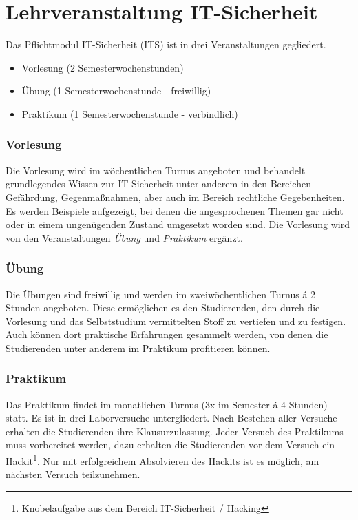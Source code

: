 \section{Lehrveranstaltung IT-Sicherheit} \label{sec:Lehrveranstaltung_IT-Sicherheit}

Das Pflichtmodul IT-Sicherheit (ITS) ist in drei Veranstaltungen gegliedert. \cite[S.30]{hochschuleniederrheinModulhandbuchVollzeitBA2019}
\begin{itemize}
	\item Vorlesung (2 Semesterwochenstunden)
	\item Übung (1 Semesterwochenstunde - freiwillig)
	\item Praktikum (1 Semesterwochenstunde - verbindlich)
\end{itemize}

\subsubsection{Vorlesung}
Die Vorlesung wird im wöchentlichen Turnus angeboten und behandelt grundlegendes Wissen zur IT-Sicherheit unter anderem in den Bereichen Gefährdung, Gegenmaßnahmen, aber auch im Bereich rechtliche Gegebenheiten. Es werden Beispiele aufgezeigt, bei denen die angesprochenen Themen gar nicht oder in einem ungenügenden Zustand umgesetzt worden sind. Die Vorlesung wird von den Veranstaltungen \textit{Übung} und \textit{Praktikum} ergänzt.

\subsubsection{Übung}
Die Übungen sind freiwillig und werden im zweiwöchentlichen Turnus á 2 Stunden angeboten. Diese ermöglichen es den Studierenden, den durch die Vorlesung und das Selbststudium vermittelten Stoff zu vertiefen und zu festigen. Auch können dort praktische Erfahrungen gesammelt werden, von denen die Studierenden unter anderem im Praktikum profitieren \linebreak können.

\subsubsection{Praktikum}
Das Praktikum findet im monatlichen Turnus (3x im Semester á 4 Stunden) statt. Es ist in drei Laborversuche untergliedert. Nach Bestehen aller Versuche erhalten die Studierenden ihre Klausurzulassung. Jeder Versuch des Praktikums muss vorbereitet werden, dazu erhalten die Studierenden vor dem Versuch ein Hackit\footnote{Knobelaufgabe aus dem Bereich IT-Sicherheit / Hacking}. Nur mit erfolgreichem Absolvieren des Hackits ist es möglich, am nächsten Versuch teilzunehmen. \cite{quadePraktikumITSecurity2017}